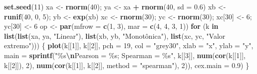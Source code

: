 \documentclass[
]{book}
\newenvironment{Shaded}{\begin{snugshade}}{\end{snugshade}}
\newcommand{\AttributeTok}[1]{\textcolor[rgb]{0.13,0.29,0.53}{#1}}
\newcommand{\ControlFlowTok}[1]{\textcolor[rgb]{0.13,0.29,0.53}{\textbf{#1}}}
\newcommand{\DecValTok}[1]{\textcolor[rgb]{0.00,0.00,0.81}{#1}}
\newcommand{\FloatTok}[1]{\textcolor[rgb]{0.00,0.00,0.81}{#1}}
\newcommand{\FunctionTok}[1]{\textcolor[rgb]{0.13,0.29,0.53}{\textbf{#1}}}
\newcommand{\NormalTok}[1]{#1}
\newcommand{\OtherTok}[1]{\textcolor[rgb]{0.56,0.35,0.01}{#1}}
\newcommand{\SpecialCharTok}[1]{\textcolor[rgb]{0.81,0.36,0.00}{\textbf{#1}}}
\newcommand{\StringTok}[1]{\textcolor[rgb]{0.31,0.60,0.02}{#1}}
\begin{document}
\begin{Shaded}
\begin{Highlighting}[]
\FunctionTok{set.seed}\NormalTok{(}\DecValTok{11}\NormalTok{)}
\NormalTok{xa }\OtherTok{\textless{}{-}} \FunctionTok{rnorm}\NormalTok{(}\DecValTok{40}\NormalTok{); ya }\OtherTok{\textless{}{-}}\NormalTok{ xa }\SpecialCharTok{+} \FunctionTok{rnorm}\NormalTok{(}\DecValTok{40}\NormalTok{, }\AttributeTok{sd =} \FloatTok{0.6}\NormalTok{)}
\NormalTok{xb }\OtherTok{\textless{}{-}} \FunctionTok{runif}\NormalTok{(}\DecValTok{40}\NormalTok{, }\DecValTok{0}\NormalTok{, }\DecValTok{5}\NormalTok{); yb }\OtherTok{\textless{}{-}} \FunctionTok{exp}\NormalTok{(xb)}
\NormalTok{xc }\OtherTok{\textless{}{-}} \FunctionTok{rnorm}\NormalTok{(}\DecValTok{30}\NormalTok{); yc }\OtherTok{\textless{}{-}} \FunctionTok{rnorm}\NormalTok{(}\DecValTok{30}\NormalTok{); xc[}\DecValTok{30}\NormalTok{] }\OtherTok{\textless{}{-}} \DecValTok{6}\NormalTok{; yc[}\DecValTok{30}\NormalTok{] }\OtherTok{\textless{}{-}} \DecValTok{6}
\NormalTok{op }\OtherTok{\textless{}{-}} \FunctionTok{par}\NormalTok{(}\AttributeTok{mfrow =} \FunctionTok{c}\NormalTok{(}\DecValTok{1}\NormalTok{, }\DecValTok{3}\NormalTok{), }\AttributeTok{mar =} \FunctionTok{c}\NormalTok{(}\DecValTok{4}\NormalTok{, }\DecValTok{4}\NormalTok{, }\DecValTok{3}\NormalTok{, }\DecValTok{1}\NormalTok{))}
\ControlFlowTok{for}\NormalTok{ (k }\ControlFlowTok{in} \FunctionTok{list}\NormalTok{(}\FunctionTok{list}\NormalTok{(xa, ya, }\StringTok{"Linear"}\NormalTok{), }\FunctionTok{list}\NormalTok{(xb, yb, }\StringTok{"Monotônica"}\NormalTok{), }\FunctionTok{list}\NormalTok{(xc, yc, }\StringTok{"Valor extremo"}\NormalTok{))) \{}
  \FunctionTok{plot}\NormalTok{(k[[}\DecValTok{1}\NormalTok{]], k[[}\DecValTok{2}\NormalTok{]], }\AttributeTok{pch =} \DecValTok{19}\NormalTok{, }\AttributeTok{col =} \StringTok{"grey30"}\NormalTok{, }\AttributeTok{xlab =} \StringTok{"x"}\NormalTok{, }\AttributeTok{ylab =} \StringTok{"y"}\NormalTok{,}
       \AttributeTok{main =} \FunctionTok{sprintf}\NormalTok{(}\StringTok{"\%s}\SpecialCharTok{\textbackslash{}n}\StringTok{Pearson = \%s; Spearman = \%s"}\NormalTok{, k[[}\DecValTok{3}\NormalTok{]],}
                      \FunctionTok{num}\NormalTok{(}\FunctionTok{cor}\NormalTok{(k[[}\DecValTok{1}\NormalTok{]], k[[}\DecValTok{2}\NormalTok{]]), }\DecValTok{2}\NormalTok{), }\FunctionTok{num}\NormalTok{(}\FunctionTok{cor}\NormalTok{(k[[}\DecValTok{1}\NormalTok{]], k[[}\DecValTok{2}\NormalTok{]], }\AttributeTok{method =} \StringTok{"spearman"}\NormalTok{), }\DecValTok{2}\NormalTok{)),}
       \AttributeTok{cex.main =} \FloatTok{0.9}\NormalTok{)}
\NormalTok{\}}
\end{Highlighting}
\end{Shaded}
\end{document}
